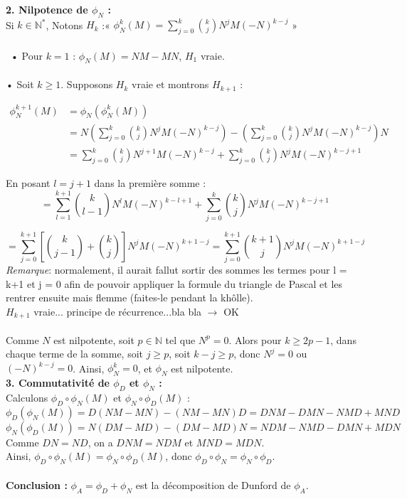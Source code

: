 \documentclass[a4paper,12pt]{article}
\begin{document}
\begin{enumerate}
\begin{correctionbox}
        \textbf{2. Nilpotence de \( \phi_N \) :} \\[2pt]
        Si \( k \in \mathbb{N}^* \), Notons \(H_k\) :« \( \phi_N^k(M) = \sum_{j=0}^k \binom{k}{j} N^j M (-N)^{k-j} \) »\\\\\
        • Pour \( k = 1 \) : \( \phi_N(M) = NM - MN \), \(H_1\) vraie. \\\\
        • Soit \( k \geq 1 \). Supposons \(H_k\) vraie et montrons \(H_{k+1}\) :
        
        \begin{align*}
            \phi_N^{k+1}(M) &= \phi_N(\phi_N^k(M))\\ 
            &= N \left( \sum_{j=0}^k \binom{k}{j} N^j M (-N)^{k-j} \right) - \left( \sum_{j=0}^k \binom{k}{j} N^j M (-N)^{k-j} \right) N\\
            &= \sum_{j=0}^k \binom{k}{j} N^{j+1} M (-N)^{k-j} + \sum_{j=0}^k \binom{k}{j} N^j M (-N)^{k-j+1}
        \end{align*}
        
        En posant \( l = j+1 \) dans la première somme :
        \[
        = \sum_{l=1}^{k+1} \binom{k}{l-1} N^{l} M (-N)^{k-l+1} + \sum_{j=0}^k \binom{k}{j} N^j M (-N)^{k-j+1}
        \]
        
        \[
        = \sum_{j=0}^{k+1} \left[ \binom{k}{j-1} + \binom{k}{j} \right] N^j M (-N)^{k+1-j} = \sum_{j=0}^{k+1} \binom{k+1}{j} N^j M (-N)^{k+1-j}
        \]
        \textit{Remarque}: normalement, il aurait fallut sortir des sommes les termes pour l = k+1 et j = 0 afin de pouvoir appliquer la formule du triangle de Pascal et les rentrer ensuite mais flemme (faites-le pendant la khôlle).\\
        \(H_{k+1}\) vraie... principe de récurrence...bla bla $\rightarrow$ OK\\\\
        Comme \( N \) est nilpotente, soit \( p \in \mathbb{N} \) tel que \( N^p = 0 \). Alors pour \( k \geq 2p-1 \), dans chaque terme de la somme, soit \( j \geq p \), soit \( k-j \geq p \), donc \( N^j = 0 \) ou \( (-N)^{k-j} = 0 \). Ainsi, \( \phi_N^k = 0 \), et \( \phi_N \) est nilpotente. \\[2pt]
        
        \textbf{3. Commutativité de \( \phi_D \) et \( \phi_N \) :} \\
        Calculons \( \phi_D \circ \phi_N(M) \) et \( \phi_N \circ \phi_D(M) \) :
        \[
        \phi_D(\phi_N(M)) = D(NM - MN) - (NM - MN)D = DNM - DMN - NMD + MND
        \]
        \[
        \phi_N(\phi_D(M)) = N(DM - MD) - (DM - MD)N = NDM - NMD - DMN + MDN
        \]
        Comme \( DN = ND \), on a \( DNM = NDM \) et \( MND = MDN \). \\
        Ainsi, \( \phi_D \circ \phi_N(M) = \phi_N \circ \phi_D(M) \), donc \( \phi_D \circ \phi_N = \phi_N \circ \phi_D \). \\\\
        \textbf{Conclusion :} \( \phi_A = \phi_D + \phi_N \) est la décomposition de Dunford de \( \phi_A \).
    \end{correctionbox}
    \end{enumerate}
\end{document}
